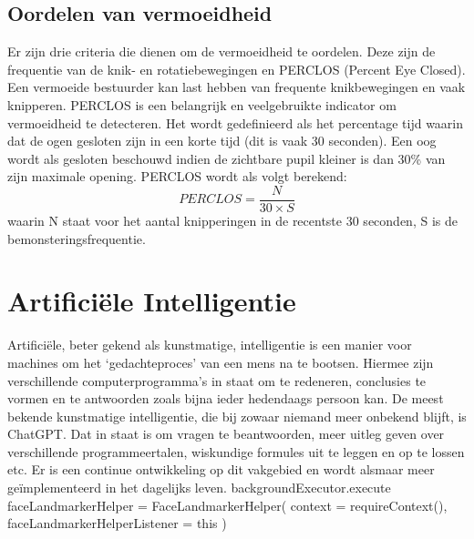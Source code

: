 \subsection{Oordelen van vermoeidheid}
Er zijn drie criteria die dienen om de vermoeidheid te oordelen. Deze zijn de frequentie van de knik- en rotatiebewegingen en PERCLOS (Percent Eye Closed). Een vermoeide bestuurder kan last hebben van frequente knikbewegingen en vaak knipperen. PERCLOS is een belangrijk en veelgebruikte indicator om vermoeidheid te detecteren. Het wordt gedefinieerd als het percentage tijd waarin dat de ogen gesloten zijn in een korte tijd (dit is vaak 30 seconden). Een oog wordt als gesloten beschouwd indien de zichtbare pupil kleiner is dan 30\% van zijn maximale opening. PERCLOS wordt als volgt berekend: \begin{equation*}PERCLOS = \frac{N}{30\times S}\end{equation*} waarin N staat voor het aantal knipperingen in de recentste 30 seconden, S is de bemonsteringsfrequentie.


\section{Artificiële Intelligentie}
Artificiële, beter gekend als kunstmatige, intelligentie is een manier voor machines om het `gedachteproces' van een mens na te bootsen. Hiermee zijn verschillende computerprogramma's in staat om te redeneren, conclusies te vormen en te antwoorden zoals bijna ieder hedendaags persoon kan. De meest bekende kunstmatige intelligentie, die bij zowaar niemand meer onbekend blijft, is ChatGPT. Dat in staat is om vragen te beantwoorden, meer uitleg geven over verschillende programmeertalen, wiskundige formules uit te leggen en op te lossen etc. Er is een continue ontwikkeling op dit vakgebied en wordt alsmaar meer geïmplementeerd in het dagelijks leven.
backgroundExecutor.execute {
    faceLandmarkerHelper = FaceLandmarkerHelper(
    context = requireContext(),
    faceLandmarkerHelperListener = this
    )
}

